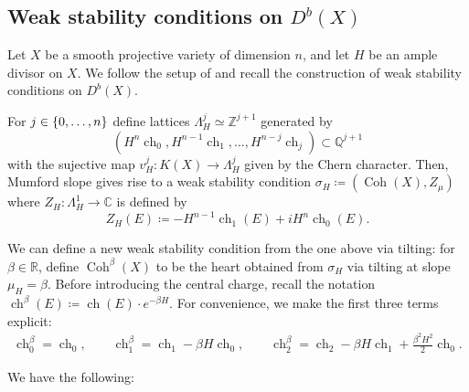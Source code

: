 \documentclass[11pt]{amsart}
\newtheorem{proposition}[thm]{Proposition}
\theoremstyle{definition}
\newcommand{\C}{\mathbb{C}}
\newcommand{\Z}{\mathbb{Z}}
\newcommand{\Q}{\mathbb{Q}}
\newcommand{\R}{\mathbb{R}}
\DeclareMathOperator{\Ch}{ch}
\DeclareMathOperator{\Coh}{Coh}
\newcommand{\sA}{\mathcal{A}}
\newcommand{\sD}{\mathcal{D}}
\DeclarePairedDelimiter{\set}{\lbrace}{\rbrace}
\DeclarePairedDelimiter{\pair}{\langle}{\rangle}
\begin{document}


\subsection{Weak stability conditions on $D^b(X)$}\label{sec_weak_stab_D(X)}

Let $X$ be a smooth projective variety of dimension $n$, and let $H$ be an ample divisor on $X$. We follow the setup of \cite[Section~2]{BLMS17} and recall the construction of weak stability conditions on $D^b(X)$.

For $j\in\set{0,\ldots,n}$ define lattices $\Lambda_H^j\simeq \Z^{j+1}$ generated by 
\[ \left(H^n \Ch_0, H^{n-1}\Ch_1,\ldots,H^{n-j}\Ch_j \right) \subset \Q^{j+1} \]
with the sujective map $v_H^j\colon K(X) \to \Lambda_H^j$ given by the Chern character. 
Then, Mumford slope gives rise to a weak stability condition $\sigma_H \coloneqq (\Coh(X),Z_\mu)$ where $Z_H\colon \Lambda_H^1\to \C$ is defined by 
\[ Z_H(E)\coloneqq -H^{n-1}\Ch_1(E) + i H^n\Ch_0(E). \]

We can define a new weak stability condition from the one above via tilting: for $\beta\in \R$, define $\Coh^\beta(X)$ to be the heart obtained from $\sigma_H$ via tilting at slope $\mu_H=\beta$. Before introducing the central charge, recall the notation $\Ch^\beta(E) \coloneqq  \Ch(E) \cdot e^{-\beta H}$. For convenience, we make the first three terms explicit:
\begin{equation*}
    \begin{split}
        \Ch_0^\beta = \Ch_0, \qquad 
        \Ch_1^\beta = \Ch_1 - \beta H\Ch_0, \qquad
        \Ch_2^\beta = \Ch_2 - \beta H \Ch_1 + \frac{\beta^2H^2}{2}\Ch_0.
    \end{split}
\end{equation*}

We have the following:
\end{document}
